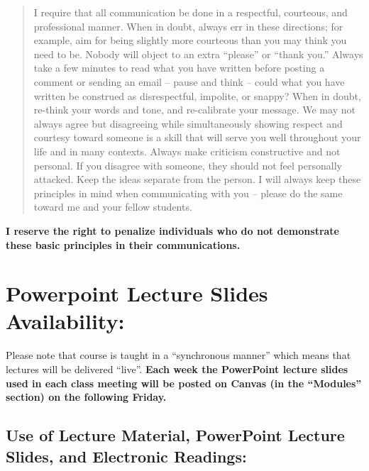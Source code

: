 \documentclass[11pt,]{article}
\begin{document}
\begin{itemize}
  \begin{quote}
  I require that all communication be done in a respectful, courteous,
  and professional manner. When in doubt, always err in these
  directions; for example, aim for being slightly more courteous than
  you may think you need to be. Nobody will object to an extra
  ``please'' or ``thank you.'' Always take a few minutes to read what
  you have written before posting a comment or sending an email -- pause
  and think -- could what you have written be construed as
  disrespectful, impolite, or snappy? When in doubt, re-think your words
  and tone, and re-calibrate your message. We may not always agree but
  disagreeing while simultaneously showing respect and courtesy toward
  someone is a skill that will serve you well throughout your life and
  in many contexts. Always make criticism constructive and not personal.
  If you disagree with someone, they should not feel personally
  attacked. Keep the ideas separate from the person. I will always keep
  these principles in mind when communicating with you -- please do the
  same toward me and your fellow students.
  \end{quote}
\end{itemize}

\textbf{I reserve the right to penalize individuals who do not
demonstrate these basic principles in their communications.}

\hypertarget{powerpoint-lecture-slides-availability}{%
\section{Powerpoint Lecture Slides
Availability:}\label{powerpoint-lecture-slides-availability}}

Please note that course is taught in a ``synchronous manner'' which
means that lectures will be delivered ``live''. \textbf{Each week the
PowerPoint lecture slides used in each class meeting will be posted on
Canvas (in the ``Modules'' section) on the following Friday.}

\hypertarget{use-of-lecture-material-powerpoint-lecture-slides-and-electronic-readings}{%
\subsection{Use of Lecture Material, PowerPoint Lecture Slides, and
Electronic
Readings:}\label{use-of-lecture-material-powerpoint-lecture-slides-and-electronic-readings}}
\end{document}
